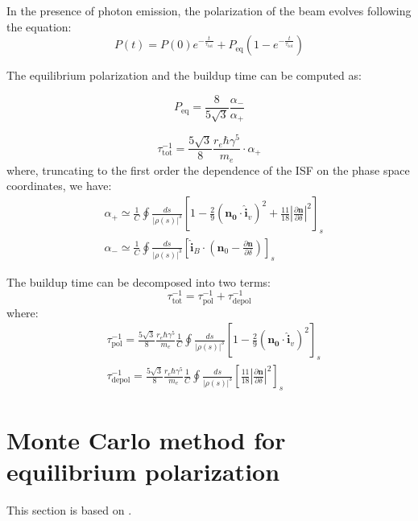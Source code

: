 In the presence of photon emission, the polarization of the beam evolves following
the equation:
\begin{equation}
P(t) = P(0) e^{-\frac{t}{\tau_\text{tot}}} + P_\text{eq} \left(1 - e^{-\frac{t}{\tau_\text{tot}}}\right)
\end{equation}

The equilibrium polarization and the buildup time can be computed as:

\begin{equation}
P_\text{eq} = \frac{8}{5\sqrt{3}} \frac{\alpha_{-}}{\alpha_{+}}
\end{equation}

\begin{equation}
\tau_\text{tot}^{-1} = \frac{5\sqrt{3}}{8} \frac{r_e \hbar \gamma^5}{m_e} \cdot \alpha_+
\end{equation}
where, truncating to the first order the dependence of the ISF on the phase space coordinates, we have:
\begin{align}
&\alpha_+ \simeq \frac{1}{C} \oint \frac{ds}{|\rho(s)|^3}
\left[
1 - \frac{2}{9} (\bm{n_0} \cdot \hat{\bm{i}}_v)^2 + \frac{11}{18} \left|  \frac{\partial \bm{n}}{\partial \delta} \right|^2
\right]_s\\
&\alpha_- \simeq  \frac{1}{C} \oint \frac{ds}{|\rho(s)|^3}
\left[\hat{\bm{i}}_B \cdot
(\bm{n}_0 - \frac{\partial \bm{n}}{\partial \delta})
\right]_s
\end{align}

The buildup time can be decomposed into two terms:
\begin{equation}
\tau_\text{tot}^{-1} = \tau_\text{pol}^{-1} + \tau_\text{depol}^{-1}
\end{equation}
where:
\begin{align}
  &\tau_\text{pol}^{-1} = \frac{5\sqrt{3}}{8} \frac{r_e \hbar \gamma^5}{m_e}
  \frac{1}{C} \oint \frac{ds}{|\rho(s)|^3}
  \left[
  1 - \frac{2}{9} (\bm{n_0} \cdot \hat{\bm{i}}_v)^2
  \right]_s\\
  &\tau_\text{depol}^{-1} = \frac{5\sqrt{3}}{8} \frac{r_e \hbar \gamma^5}{m_e}
  \frac{1}{C} \oint \frac{ds}{|\rho(s)|^3}
  \left[
    \frac{11}{18} \left|  \frac{\partial \bm{n}}{\partial \delta} \right|^2
  \right]_s
\end{align}

\section{Monte Carlo method for equilibrium polarization}
This section is based on \cite{Boge:1994we, DUAN201581}.


